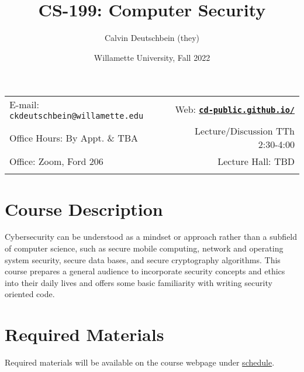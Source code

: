 \documentclass[11pt]{article}
\title{CS-199: Computer Security}
\author{Calvin Deutschbein (they)}
\date{Willamette University, Fall 2022}
\newcommand{\blankline}{\quad\pagebreak[2]}
\begin{document}
\maketitle

\blankline

\begin{tabular*}{.93\textwidth}{@{\extracolsep{\fill}}lr}


E-mail: \texttt{ckdeutschbein@willamette.edu} & Web: \href{https://cd-public.github.io/courses/computer_security/451f21.html}{\tt\bf cd-public.github.io/}  \\

 Office Hours: By Appt. \& TBA  &  Lecture/Discussion TTh 2:30-4:00 \\

 Office: Zoom, Ford 206 & Lecture Hall: TBD\\
 & \\
\hline
\end{tabular*}

\vspace{5 mm}


\section*{Course Description}

Cybersecurity can be understood as a mindset or approach rather than a subfield of computer science, such as secure mobile computing, network and operating system security, secure data bases, and secure cryptography algorithms. This course prepares a general audience to incorporate security concepts and ethics into their daily lives and offers some basic familiarity with writing security oriented code. 


\section*{Required Materials}

Required materials will be available on the course webpage under \href{https://cd-public.github.io/courses/sec/sched.html}{schedule}.


\end{document}
